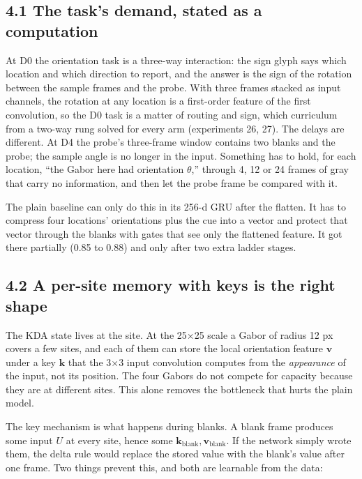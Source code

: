 \documentclass[

]{article}
\begin{document}
\subsection{4.1 The task's demand, stated as a computation}\label{the-tasks-demand-stated-as-a-computation}



At D0 the orientation task is a three-way interaction: the sign glyph says which location and which direction to report, and the answer is the sign of the rotation between the sample frames and the probe. With three frames stacked as input channels, the rotation at any location is a first-order feature of the first convolution, so the D0 task is a matter of routing and sign, which curriculum from a two-way rung solved for every arm (experiments 26, 27). The delays are different. At D4 the probe's three-frame window contains two blanks and the probe; the sample angle is no longer in the input. Something has to hold, for each location, ``the Gabor here had orientation \(\theta\),'' through 4, 12 or 24 frames of gray that carry no information, and then let the probe frame be compared with it.



The plain baseline can only do this in its 256-d GRU after the flatten. It has to compress four locations' orientations plus the cue into a vector and protect that vector through the blanks with gates that see only the flattened feature. It got there partially (0.85 to 0.88) and only after two extra ladder stages.



\subsection{4.2 A per-site memory with keys is the right shape}\label{a-per-site-memory-with-keys-is-the-right-shape}



The KDA state lives at the site. At the 25×25 scale a Gabor of radius 12 px covers a few sites, and each of them can store the local orientation feature \(\mathbf{v}\) under a key \(\mathbf{k}\) that the 3×3 input convolution computes from the \emph{appearance} of the input, not its position. The four Gabors do not compete for capacity because they are at different sites. This alone removes the bottleneck that hurts the plain model.



The key mechanism is what happens during blanks. A blank frame produces some input \(U\) at every site, hence some \(\mathbf{k}_\text{blank},\mathbf{v}_\text{blank}\). If the network simply wrote them, the delta rule would replace the stored value with the blank's value after one frame. Two things prevent this, and both are learnable from the data:
\end{document}
